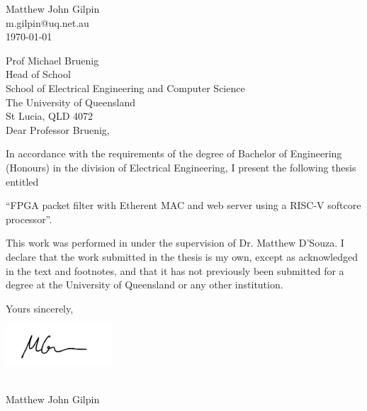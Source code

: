\fancyhf{}

\begin{flushright}
	Matthew John Gilpin\\
	m.gilpin@uq.net.au\\
	\medskip
	\today
\end{flushright}

\begin{flushleft}
  Prof Michael Bruenig\\
  Head of School\\
  School of Electrical Engineering and Computer Science\\
  The University of Queensland\\
  St Lucia, QLD 4072\\
  \bigskip\bigskip
  Dear Professor Bruenig,
\end{flushleft}

\noindent
In accordance with the requirements of the degree of Bachelor of
Engineering (Honours) in the division of Electrical Engineering,
I present the following thesis entitled 

\vspace{1em}
{\centering “FPGA packet filter with Etherent MAC and web server using a RISC-V softcore processor”.\par}
\vspace{1em}

\noindent This work was performed in under the supervision of
Dr. Matthew D'Souza. I declare that the work submitted in the thesis is my own, 
except as acknowledged in the text and footnotes, and that it has
not previously been submitted for a degree at the University of 
Queensland or any other institution.\bigskip \bigskip

    

\begin{flushright}
    Yours sincerely,\\
    \medskip
	
    \begin{minipage}[t]{4cm}
        \begin{flushright}
            \includegraphics[width=4cm]{Images/signature.png}
        \end{flushright}
    \end{minipage}\\
	\vspace{-0.2cm}
    Matthew John Gilpin
\end{flushright}

\clearpage